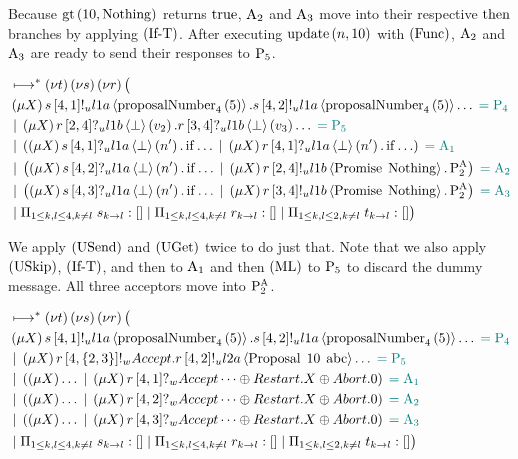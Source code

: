 Because $\greaterThan{10}{\Nothing}$ returns $\True$, $\Acceptor{2}$ and $\Acceptor{3}$ move into their respective $\Then$ branches by applying $\RIfT$.
After executing $\update{n}{10}$ with $\RSideEffect$, $\Acceptor{2}$ and $\Acceptor{3}$ are ready to send their responses to $\Proposer{5}$.

\begin{align*}
&\mapstostar \NuChannels \big (\\
&\Mu{X} \SendUnreliableP{s}{4}{1}{\LOneA}{\proposalNumber{5}{4}}.\SendUnreliableP{s}{4}{2}{\LOneA}{\proposalNumber{5}{4}}\dots \comment{= \Proposer{4}}\\
&\Or \Mu{X} \ReceiveUnreliableP{r}{2}{4}{\LOneB}{\bot}{v_2}.\ReceiveUnreliableP{r}{3}{4}{\LOneB}{\bot}{v_3}\dots \comment{= \Proposer{5}}\\
&\Or \Paren{
    \Mu{X} \ReceiveUnreliableP{s}{4}{1}{\LOneA}{\bot}{n'}.\If{\dots}
    \Or \Mu{X} \ReceiveUnreliableP{r}{4}{1}{\LOneA}{\bot}{n'}.\If{\dots}
} \comment{= \Acceptor{1}}\\
&\Or \Paren{
    \Mu{X} \ReceiveUnreliableP{s}{4}{2}{\LOneA}{\bot}{n'}.\If{\dots}
    \Or \Mu{X} \SendUnreliableP{r}{2}{4}{\LOneB}{\Promise{\Nothing}}.\PaTwo
} \comment{= \Acceptor{2}}\\
&\Or \Paren{
    \Mu{X} \ReceiveUnreliableP{s}{4}{3}{\LOneA}{\bot}{n'}.\If{\dots}
    \Or \Mu{X} \SendUnreliableP{r}{3}{4}{\LOneB}{\Promise{\Nothing}}.\PaTwo
} \comment{= \Acceptor{3}}\\
&\Or \InnerSessionQueues{s}
\Or \InnerSessionQueues{r}
\Or \OuterSessionQueues
\big )
\end{align*}

We apply $\RUsend$ and $\RUget$ twice to do just that.
Note that we also apply $\RUskip$, $\RIfT$, and then \RUsend to $\Acceptor{1}$ and then $\Rml$ to $\Proposer{5}$ to discard the dummy message.
All three acceptors move into $\PaTwo$.

\begin{align*}
&\mapstostar \NuChannels \big (\\
&\Mu{X} \SendUnreliableP{s}{4}{1}{\LOneA}{\proposalNumber{5}{4}}.\SendUnreliableP{s}{4}{2}{\LOneA}{\proposalNumber{5}{4}}\dots \comment{= \Proposer{4}}\\
&\Or \Mu{X} \SendWeaklyP{r}{4}{\Curly{2,3}}{\Accept}{\SendUnreliableP{r}{4}{2}{\LTwoA}{\ProposalC{10}{\ABC}}}\dots \comment{= \Proposer{5}}\\
&\Or \Paren{
    \Mu{X} \dots
    \Or \Mu{X} \ReceiveWeaklyP{r}{4}{1}{\BeginPaCont}
} \comment{= \Acceptor{1}}\\
&\Or \Paren{
    \Mu{X} \dots
    \Or \Mu{X} \ReceiveWeaklyP{r}{4}{2}{\BeginPaCont}
} \comment{= \Acceptor{2}}\\
&\Or \Paren{
    \Mu{X} \dots
    \Or \Mu{X} \ReceiveWeaklyP{r}{4}{3}{\BeginPaCont}
} \comment{= \Acceptor{3}}\\
&\Or \InnerSessionQueues{s}
\Or \InnerSessionQueues{r}
\Or \OuterSessionQueues
\big )
\end{align*}


